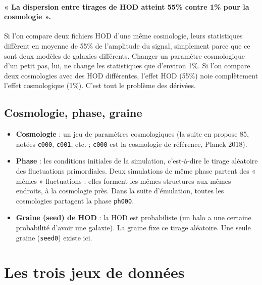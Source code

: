 \documentclass[11pt]{article}
\begin{document}
\paragraph{« La dispersion entre tirages de HOD atteint 55\% contre 1\% pour la cosmologie ».} Si l'on compare deux fichiers HOD d'une même cosmologie, leurs statistiques diffèrent en moyenne de 55\% de l'amplitude du signal, simplement parce que ce sont deux modèles de galaxies différents. Changer un paramètre cosmologique d'un petit pas, lui, ne change les statistiques que d'environ 1\%. Si l'on compare deux cosmologies avec des HOD différentes, l'effet HOD (55\%) noie complètement l'effet cosmologique (1\%). C'est tout le problème des dérivées.

\subsection{Cosmologie, phase, graine}
\begin{itemize}
\item \textbf{Cosmologie} : un jeu de paramètres cosmologiques (la suite en propose 85, notées \texttt{c000}, \texttt{c001}, etc. ; \texttt{c000} est la cosmologie de référence, Planck 2018).
\item \textbf{Phase} : les conditions initiales de la simulation, c'est-à-dire le tirage aléatoire des fluctuations primordiales. Deux simulations de même phase partent des « mêmes » fluctuations : elles forment les mêmes structures aux mêmes endroits, à la cosmologie près. Dans la suite d'émulation, toutes les cosmologies partagent la phase \texttt{ph000}.
\item \textbf{Graine (seed) de HOD} : la HOD est probabiliste (un halo a une certaine probabilité d'avoir une galaxie). La graine fixe ce tirage aléatoire. Une seule graine (\texttt{seed0}) existe ici.
\end{itemize}

\section{Les trois jeux de données}
\end{document}
